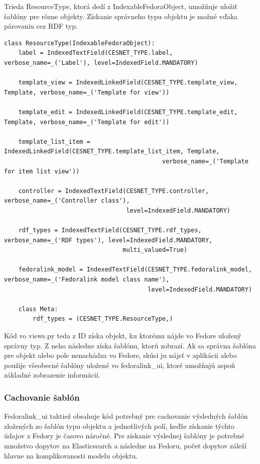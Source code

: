 \documentclass[thesis=M,slovak]{FITthesis}[2013/05/06]
\begin{document}
Trieda ResourceType, ktorá dedí z IndexableFedoraObject, umožňuje uložiť šablóny pre rôzne objekty. Získanie správneho typu objektu je možné vďaka párovaniu cez RDF typ.
\begin{lstlisting}[frame=single] 
class ResourceType(IndexableFedoraObject):
    label = IndexedTextField(CESNET_TYPE.label, verbose_name=_('Label'), level=IndexedField.MANDATORY)

    template_view = IndexedLinkedField(CESNET_TYPE.template_view, Template, verbose_name=_('Template for view'))

    template_edit = IndexedLinkedField(CESNET_TYPE.template_edit, Template, verbose_name=_('Template for edit'))

    template_list_item = IndexedLinkedField(CESNET_TYPE.template_list_item, Template,
                                            verbose_name=_('Template for item list view'))

    controller = IndexedTextField(CESNET_TYPE.controller, verbose_name=_('Controller class'),
                                  level=IndexedField.MANDATORY)

    rdf_types = IndexedTextField(CESNET_TYPE.rdf_types, verbose_name=_('RDF types'), level=IndexedField.MANDATORY,
                                 multi_valued=True)

    fedoralink_model = IndexedTextField(CESNET_TYPE.fedoralink_model, verbose_name=_('Fedoralink model class name'),
                                        level=IndexedField.MANDATORY)

    class Meta:
        rdf_types = (CESNET_TYPE.ResourceType,)
\end{lstlisting}

Kód vo views.py teda z ID získa objekt, ku ktorému nájde vo Fedore uložený správny typ. Z neho následne získa šablónu, ktorú zobrazí. Ak sa správna šablóna pre objekt alebo pole nenachádza vo Fedore, skúsi ju nájsť v aplikácii alebo použije všeobecné šablóny uložené vo fedoralink\_ui, ktoré umožňujú aspoň základné zobrazenie informácií.

\subsubsection{Cachovanie šablón}
Fedoralink\_ui taktiež obsahuje kód potrebný pre cachovanie výsledných šablón zložených zo šablón typu objektu a jednotlivých polí, keďže získanie týchto údajov z Fedory je časovo náročné. Pre získanie výslednej šablóny je potrebné množstvo dopytov na Elasticsearch a následne na Fedoru, počet dopytov záleží hlavne na komplikovanosti modelu objektu.
\end{document}
